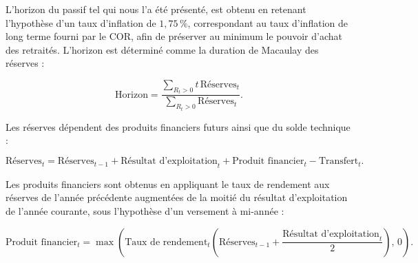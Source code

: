 \documentclass[11pt,a4paper]{article}
\begin{document}
L’horizon du passif tel qui nous l'a été présenté, est obtenu en retenant l’hypothèse d’un taux d’inflation de \(1{,}75\,\%\), correspondant au taux d’inflation de long terme fourni par le COR, afin de préserver au minimum le pouvoir d’achat des retraités.
L’horizon est déterminé comme la duration de Macaulay des réserves :
\begin{definitionbox}
\[
\text{Horizon}
=
\frac{\displaystyle\sum_{R_t>0} t\,\text{Réserves}_t}
{\displaystyle\sum_{R_t>0} \text{Réserves}_t}.
\]
\end{definitionbox}
Les réserves dépendent des produits financiers futurs ainsi que du solde technique :
\begin{definitionbox}
\[
\text{Réserves}_t
=
\text{Réserves}_{t-1}
+
\text{Résultat d'exploitation}_t
+
\text{Produit financier}_t
-
\text{Transfert}_t.
\]
\end{definitionbox}
Les produits financiers sont obtenus en appliquant le taux de rendement aux réserves de l’année précédente augmentées de la moitié du résultat d’exploitation de l’année courante, sous l’hypothèse d’un versement à mi-année :
\begin{definitionbox}
\[
\text{Produit financier}_t
=
\max\left(
\text{Taux de rendement}_t
\left(
\text{Réserves}_{t-1}
+
\frac{\text{Résultat d'exploitation}_t}{2}
\right),
\,0
\right).
\]
\end{definitionbox}
\end{document}
